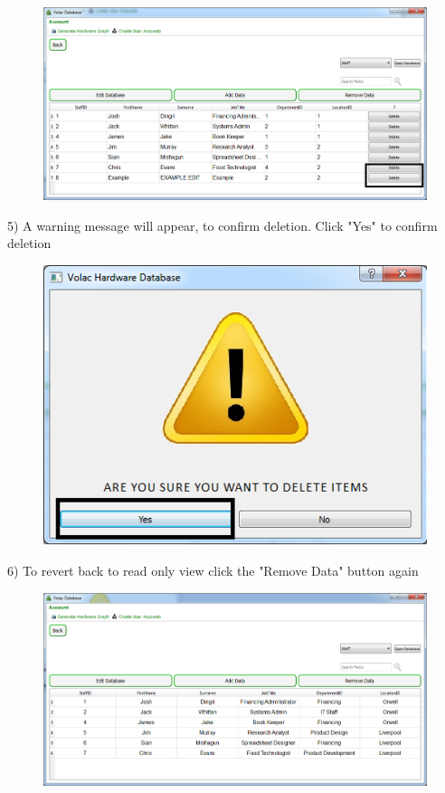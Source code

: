 \begin{figure}[H]
    \includegraphics[width=\textwidth]{./Manual/Images/deletedata2.png}
\end{figure}

5) A warning message will appear, to confirm deletion. Click "Yes" to confirm deletion

\begin{figure}[H]
    \includegraphics[width=\textwidth]{./Manual/Images/deletedata3.png}
\end{figure}

6) To revert back to read only view click the "Remove Data" button again

\begin{figure}[H]
    \includegraphics[width=\textwidth]{./Manual/Images/deletedata4.png}
\end{figure}


